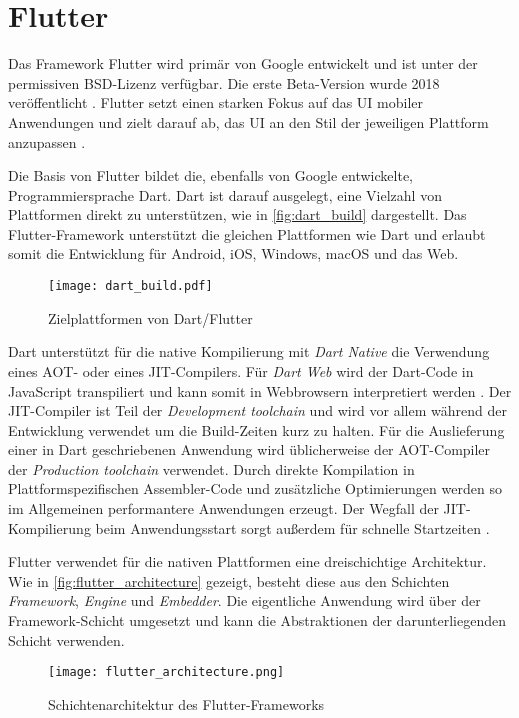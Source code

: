 \section{Flutter}
\label{sec:Frameworks_Flutter}

Das Framework Flutter wird primär von Google entwickelt und ist unter der permissiven BSD-Lizenz verfügbar.
Die erste Beta-Version wurde 2018 veröffentlicht \cite{Sharma_Flutter}.
Flutter setzt einen starken Fokus auf das \ac{UI} mobiler Anwendungen und zielt darauf ab, das \ac{UI} an den Stil der jeweiligen Plattform anzupassen \cite{Flutter_Architektur}.


Die Basis von Flutter bildet die, ebenfalls von Google entwickelte, Programmiersprache Dart.
Dart ist darauf ausgelegt, eine Vielzahl von Plattformen direkt zu unterstützen, wie in \autoref{fig:dart_build} dargestellt.
Das Flutter-Framework unterstützt die gleichen Plattformen wie Dart und erlaubt somit die Entwicklung für Android, iOS, Windows, macOS und das Web.
\begin{figure}[ht]
    \centering
    \texttt{[image: dart\_build.pdf]}
    \caption{Zielplattformen von Dart/Flutter \cite{Dart_Overview}}
    \label{fig:dart_build}
\end{figure}


Dart unterstützt für die native Kompilierung mit \textit{Dart Native} die Verwendung eines \ac{AOT}- oder eines \ac{JIT}-Compilers.
Für \textit{Dart Web} wird der Dart-Code in JavaScript transpiliert und kann somit in Webbrowsern interpretiert werden \cite{Flutter_Architektur}.
Der \ac{JIT}-Compiler ist Teil der \textit{Development toolchain} und wird vor allem während der Entwicklung verwendet um die Build-Zeiten kurz zu halten.
Für die Auslieferung einer in Dart geschriebenen Anwendung wird üblicherweise der \ac{AOT}-Compiler der \textit{Production toolchain} verwendet.
Durch direkte Kompilation in Plattformspezifischen Assembler-Code und zusätzliche Optimierungen werden so im Allgemeinen performantere Anwendungen erzeugt.
Der Wegfall der \ac{JIT}-Kompilierung beim Anwendungsstart sorgt außerdem für schnelle Startzeiten \cite{Dart_Overview}.



Flutter verwendet für die nativen Plattformen eine dreischichtige Architektur.
Wie in \autoref{fig:flutter_architecture} gezeigt, besteht diese aus den Schichten \textit{Framework}, \textit{Engine} und \textit{Embedder}.
Die eigentliche Anwendung wird über der Framework-Schicht umgesetzt und kann die Abstraktionen der darunterliegenden Schicht verwenden.
\begin{figure}[h]
    \centering
    \texttt{[image: flutter\_architecture.png]}
    \caption{Schichtenarchitektur des Flutter-Frameworks \cite{Flutter_Architektur}}
    \label{fig:flutter_architecture}
\end{figure}

